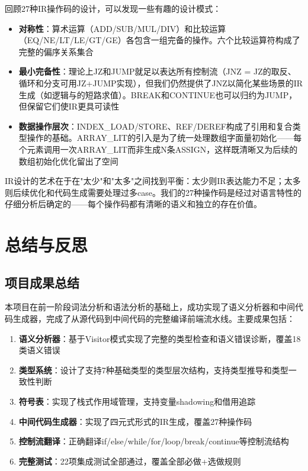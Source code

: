 \documentclass[12pt,a4paper]{ctexart}
\begin{document}
回顾27种IR操作码的设计，可以发现一些有趣的设计模式：

\begin{itemize}
    \item \textbf{对称性}：算术运算（ADD/SUB/MUL/DIV）和比较运算（EQ/NE/LT/LE/GT/GE）各包含一组完备的操作。六个比较运算符构成了完整的偏序关系集合
    \item \textbf{最小完备性}：理论上JZ和JUMP就足以表达所有控制流（JNZ = JZ的取反、循环和分支可用JZ+JUMP实现），但我们仍然提供了JNZ以简化某些场景的IR生成（如逻辑与的短路求值）。BREAK和CONTINUE也可以归约为JUMP，但保留它们使IR更具可读性
    \item \textbf{数据操作层次}：INDEX\_LOAD/STORE、REF/DEREF构成了引用和复合类型操作的基础。ARRAY\_LIT的引入是为了统一处理数组字面量初始化——每个元素调用一次ARRAY\_LIT而非生成N条ASSIGN，这样既清晰又为后续的数组初始化优化留出了空间
\end{itemize}

IR设计的艺术在于在"太少"和"太多"之间找到平衡：太少则IR表达能力不足；太多则后续优化和代码生成需要处理过多case。我们的27种操作码是经过对语言特性的仔细分析后确定的——每个操作码都有清晰的语义和独立的存在价值。

\newpage

\section{总结与反思}

\subsection{项目成果总结}

本项目在前一阶段词法分析和语法分析的基础上，成功实现了语义分析器和中间代码生成器，完成了从源代码到中间代码的完整编译前端流水线。主要成果包括：

\begin{enumerate}
    \item \textbf{语义分析器}：基于Visitor模式实现了完整的类型检查和语义错误诊断，覆盖18类语义错误
    \item \textbf{类型系统}：设计了支持7种基础类型的类型层次结构，支持类型推导和类型一致性判断
    \item \textbf{符号表}：实现了栈式作用域管理，支持变量shadowing和借用追踪
    \item \textbf{中间代码生成器}：实现了四元式形式的IR生成，覆盖27种操作码
    \item \textbf{控制流翻译}：正确翻译if/else/while/for/loop/break/continue等控制流结构
    \item \textbf{完整测试}：22项集成测试全部通过，覆盖全部必做+选做规则
\end{enumerate}
\end{document}
